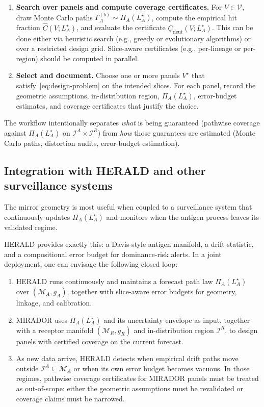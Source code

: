 \documentclass[11pt]{article}
\begin{document}
\begin{enumerate}
  \item \textbf{Search over panels and compute coverage certificates.}
  For $V \in \mathcal{V}$, draw Monte Carlo paths $\Gamma_A^{(b)} \sim \Pi_A(L_A^\star)$, compute
  the empirical hit fraction $\widehat{C}(V;L_A^\star)$, and evaluate the certificate
  $\underline{C}_{\mathrm{neut}}(V;L_A^\star)$. This can be done either via heuristic search (e.g.,
  greedy or evolutionary algorithms) or over a restricted design grid. Slice-aware certificates
  (e.g., per-lineage or per-region) should be computed in parallel.

  \item \textbf{Select and document.}
  Choose one or more panels $V^\star$ that satisfy~\eqref{eq:design-problem} on the intended
  slices. For each panel, record the geometric assumptions, in-distribution region,
  $\Pi_A(L_A^\star)$, error-budget estimates, and coverage certificates that justify the choice.
\end{enumerate}

The workflow intentionally separates \emph{what} is being guaranteed (pathwise coverage against
$\Pi_A(L_A^\star)$ on $\mathcal{I}^A \times \mathcal{I}^R$) from \emph{how} those guarantees are
estimated (Monte Carlo paths, distortion audits, error-budget estimation).

\subsection{Integration with HERALD and other surveillance systems}

The mirror geometry is most useful when coupled to a surveillance system that continuously updates
$\Pi_A(L_A^\star)$ and monitors when the antigen process leaves its validated regime.

HERALD provides exactly this: a Davis-style antigen manifold, a drift statistic, and a compositional
error budget for dominance-risk alerts. In a joint deployment, one can envisage the following
closed loop:
\begin{enumerate}
  \item HERALD runs continuously and maintains a forecast path law $\Pi_A(L_A^\star)$ over
  $(\mathcal{M}_A,g_A)$, together with slice-aware error budgets for geometry, linkage, and
  calibration.

  \item MIRADOR uses $\Pi_A(L_A^\star)$ and its uncertainty envelope as input, together with a
  receptor manifold $(\mathcal{M}_R,g_R)$ and in-distribution region $\mathcal{I}^R$, to design
  panels with certified coverage on the current forecast.

  \item As new data arrive, HERALD detects when empirical drift paths move outside
  $\mathcal{I}^A \subseteq \mathcal{M}_A$ or when its own error budget becomes vacuous. In those
  regimes, pathwise coverage certificates for MIRADOR panels must be treated as out-of-scope:
  either the geometric assumptions must be revalidated or coverage claims must be narrowed.
\end{enumerate}
\end{document}
